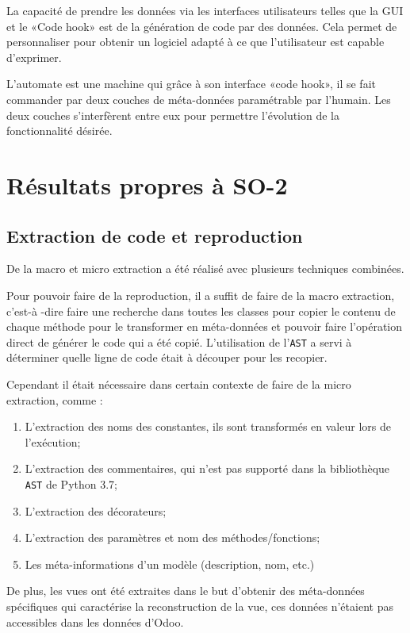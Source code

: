 La capacité de prendre les données via les interfaces utilisateurs telles que la GUI et le «Code hook» est de la génération de code par des données. Cela permet de personnaliser pour obtenir un logiciel adapté à ce que l’utilisateur est capable d’exprimer.

L’automate est une machine qui grâce à son interface «code hook», il se fait commander par deux couches de méta-données paramétrable par l’humain. Les deux couches s’interfèrent entre eux pour permettre l’évolution de la fonctionnalité désirée.


\section{Résultats propres à SO-2}

\subsection {Extraction de code et reproduction}

De la macro et micro extraction a été réalisé avec plusieurs techniques combinées.

Pour pouvoir faire de la reproduction, il a suffit de faire de la macro extraction, c'est-à -dire faire une recherche dans toutes les classes pour copier le contenu de chaque méthode pour le transformer en méta-données et pouvoir faire l’opération direct de générer le code qui a été copié. L’utilisation de l’\texttt{AST} a servi à déterminer quelle ligne de code était à découper pour les recopier.

Cependant il était nécessaire dans certain contexte de faire de la micro extraction, comme : 
\begin{enumerate}
    \item L’extraction des noms des constantes, ils sont transformés en valeur lors de l’exécution;
    \item L’extraction des commentaires, qui n’est pas supporté dans la bibliothèque \texttt{AST} de Python 3.7;
    \item L’extraction des décorateurs;
    \item L’extraction des paramètres et nom des méthodes/fonctions;
    \item Les méta-informations d’un modèle (description, nom, etc.)
\end{enumerate}

De plus, les vues ont été extraites dans le but d'obtenir des méta-données spécifiques qui caractérise la reconstruction de la vue, ces données n’étaient pas accessibles dans les données d'Odoo.


